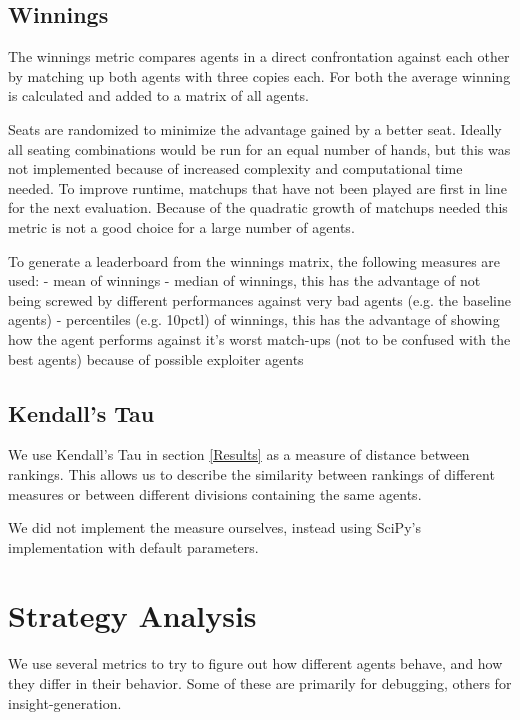 \subsection{Winnings}
The winnings metric compares agents in a direct confrontation against each other by matching up both agents with three copies each. For both the average winning is calculated and added to a matrix of all agents.

Seats are randomized to minimize the advantage gained by a better seat. Ideally all seating combinations would be run for an equal number of hands, but this was not implemented because of increased complexity and computational time needed.  To improve runtime, matchups that have not been played are first in line for the next evaluation. Because of the quadratic growth of matchups needed this metric is not a good choice for a large number of agents.

To generate a leaderboard from the winnings matrix, the following measures are used:
- mean of winnings
- median of winnings, this has the advantage of not being screwed by different performances against very bad agents (e.g. the baseline agents)
- percentiles (e.g. 10pctl) of winnings, this has the advantage of showing how the agent performs against it's worst match-ups (not to be confused with the best agents) because of possible exploiter agents


\subsection{Kendall's Tau}

We use Kendall's Tau \cite{KendallTau} in section \ref{Results} as a measure of distance between rankings. This allows us to describe the similarity between rankings of different measures or between different divisions containing the same agents.


We did not implement the measure ourselves, instead using SciPy's implementation \cite{Scipy} with default parameters.

\section{Strategy Analysis}

We use several metrics to try to figure out how different agents behave, and how they differ in their behavior. Some of these are primarily for debugging, others for insight-generation.

